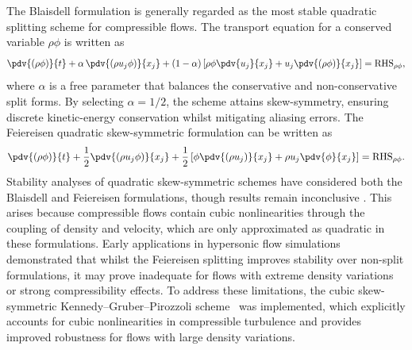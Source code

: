 The Blaisdell formulation \citep{BlaisdellEtAl1996} is generally regarded as the most stable quadratic splitting scheme for compressible flows. The transport equation for a conserved variable $\rho \phi$ is written as
\begin{equation}
    \pdv{(\rho \phi)}{t} 
    + \alpha \, \pdv{(\rho u_j \phi)}{x_j} 
    + (1-\alpha) \left[ \rho \phi \pdv{u_j}{x_j} + u_j \pdv{(\rho \phi)}{x_j} \right] 
    = \text{RHS}_{\rho \phi},
    \label{eq:blaisdell}
\end{equation}
where $\alpha$ is a free parameter that balances the conservative and non-conservative split forms. By selecting $\alpha=1/2$, the scheme attains skew-symmetry, ensuring discrete kinetic-energy conservation whilst mitigating aliasing errors. The Feiereisen quadratic skew-symmetric formulation \citep{Feiereisen1981} can be written as
\begin{equation}
    \pdv{(\rho \phi)}{t} 
    + \frac{1}{2} \pdv{(\rho u_j \phi)}{x_j} 
    + \frac{1}{2} \left[ \phi \pdv{(\rho u_j)}{x_j} + \rho u_j \pdv{\phi}{x_j} \right] 
    = \text{RHS}_{\rho \phi}.
    \label{eq:feiereisen}
\end{equation}
Stability analyses of quadratic skew-symmetric schemes have considered both the Blaisdell and Feiereisen formulations, though results remain inconclusive \citep{BlaisdellEtAl1996,DucrosEtAl2000}. This arises because compressible flows contain cubic nonlinearities through the coupling of density and velocity, which are only approximated as quadratic in these formulations. Early applications in hypersonic flow simulations \citep{SjoegrenYee2010} demonstrated that whilst the Feiereisen splitting improves stability over non-split formulations, it may prove inadequate for flows with extreme density variations or strong compressibility effects. To address these limitations, the cubic skew-symmetric Kennedy--Gruber--Pirozzoli scheme~\citep{KennedyGruber2008,CoppolaEtAl2019,CoppolaEtAl2019b} was implemented, which explicitly accounts for cubic nonlinearities in compressible turbulence and provides improved robustness for flows with large density variations.






